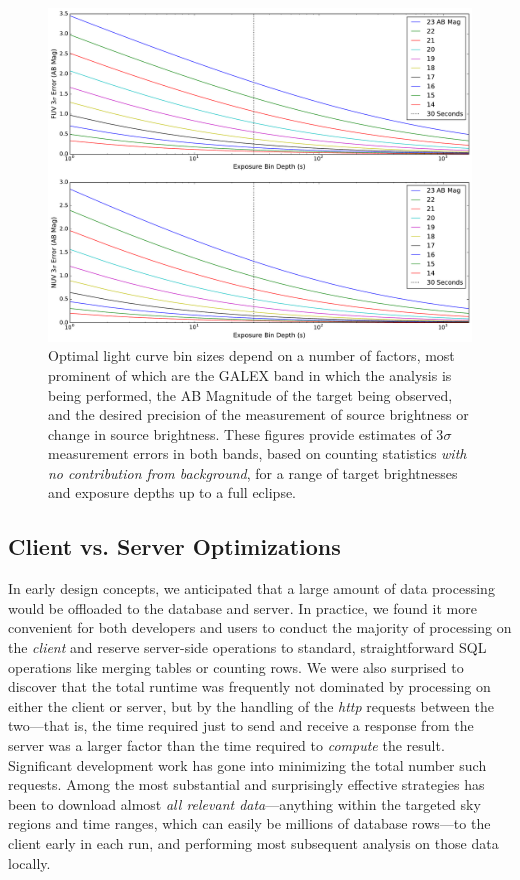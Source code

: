 \documentclass[preprint]{aastex}
\begin{document}
\clearpage
\begin{figure}[h]
\includegraphics[scale=0.49]{Fig11.pdf}
\caption{Optimal light curve bin sizes depend on a number of factors, most prominent of which are the GALEX band in which the analysis is being performed, the AB Magnitude of the target being observed, and the desired precision of the measurement of source brightness or change in source brightness. These figures provide estimates of 3$\sigma$ measurement errors in both bands, based on counting statistics \emph{with no contribution from background}, for a range of target brightnesses and exposure depths up to a full eclipse.
\label{sigmadetlim}}
\end{figure}
\clearpage

\subsection{Client vs. Server Optimizations}
\label{speedopt}
In early design concepts, we anticipated that a large amount of data processing would be offloaded to the database and server. In practice, we found it more convenient for both developers and users to conduct the majority of processing on the \emph{client} and reserve server-side operations to standard, straightforward SQL operations like merging tables or counting rows. We were also surprised to discover that the total runtime was frequently not dominated by processing on either the client or server, but by the handling of the \emph{http} requests between the two---that is, the time required just to send and receive a response from the server was a larger factor than the time required to \emph{compute} the result. Significant development work has gone into minimizing the total number such requests. Among the most substantial and surprisingly effective strategies has been to download almost \emph{all relevant data}---anything within the targeted sky regions and time ranges, which can easily be millions of database rows---to the client early in each run, and performing most subsequent analysis on those data locally.
\end{document}
